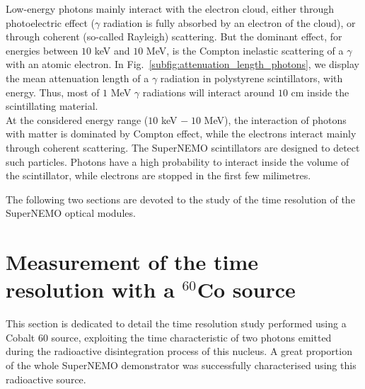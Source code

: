 Low-energy photons mainly interact with the electron cloud, either through photoelectric effect ($\gamma$ radiation is fully absorbed by an electron of the cloud), or through coherent (so-called Rayleigh) scattering.
But the dominant effect, for energies between $10$ keV and $10$ MeV, is the Compton inelastic scattering of a $\gamma$ with an atomic electron.
In Fig.~\ref{subfig:attenuation_length_photons}, we display the mean attenuation length of a $\gamma$ radiation in polystyrene scintillators, with energy.
Thus, most of $1$ MeV $\gamma$ radiations will interact around $10$ cm inside the scintillating material.\\

At the considered energy range ($10$ keV $ -\; 10$ MeV), the interaction of photons with matter is dominated by Compton effect, while the electrons interact mainly through coherent scattering.
The SuperNEMO scintillators are designed to detect such particles.
Photons have a high probability to interact inside the volume of the scintillator, while electrons are stopped in the first few milimetres.

The following two sections are devoted to the study of the time resolution of the SuperNEMO optical modules.



\section{Measurement of the time resolution with a $^{60}$Co source}
\label{sec:Co_analysis}
This section is dedicated to detail the time resolution study performed using a Cobalt $60$ source, exploiting the time characteristic of two photons emitted during the radioactive disintegration process of this nucleus.
A great proportion of the whole SuperNEMO demonstrator was successfully characterised using this radioactive source.

